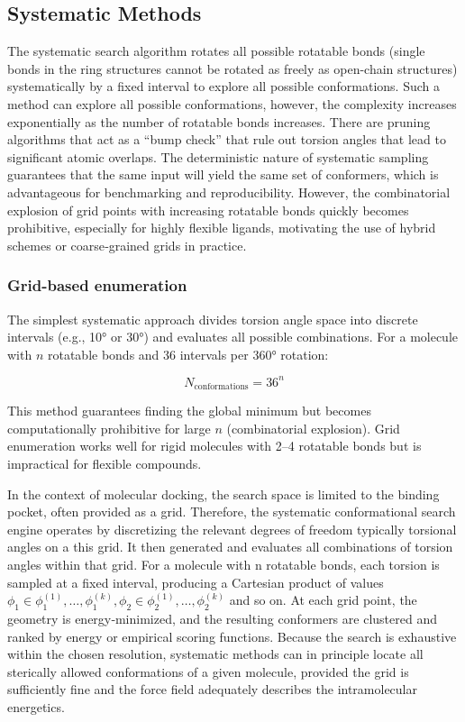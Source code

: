 \documentclass[12pt]{article}
\begin{document}
\subsection{Systematic Methods}
The systematic search algorithm rotates all possible rotatable bonds (single bonds in the ring structures cannot be rotated as freely as open-chain structures) systematically by a fixed interval to explore all possible conformations. Such a method can explore all possible conformations, however, the complexity increases exponentially as the number of rotatable bonds increases. There are pruning algorithms that act as a “bump check” that rule out torsion angles that lead to significant atomic overlaps. The deterministic nature of systematic sampling guarantees that the same input will yield the same set of conformers, which is advantageous for benchmarking and reproducibility. However, the combinatorial explosion of grid points with increasing rotatable bonds quickly becomes prohibitive, especially for highly flexible ligands, motivating the use of hybrid schemes or coarse‑grained grids in practice\cite{CH2_Beusen1996,CH2_Leach2001}.

\subsubsection{Grid-based enumeration} 
 
    The simplest systematic approach divides torsion angle space into discrete intervals (e.g., 10° or 30°) and evaluates all possible combinations. For a molecule with $n$ rotatable bonds and 36 intervals per 360° rotation:

\begin{equation}
N_{\text{conformations}} = 36^n
\label{eq:grid_enumeration}
\end{equation}

    This method guarantees finding the global minimum but becomes computationally prohibitive for large $n$ (combinatorial explosion). Grid enumeration works well for rigid molecules with 2--4 rotatable bonds but is impractical for flexible compounds.
    
    In the context of molecular docking, the search space is limited to the binding pocket, often provided as a grid. Therefore, the systematic conformational search engine operates by discretizing the relevant degrees of freedom typically torsional angles on a this grid.  It then generated and evaluates all combinations of torsion angles within that grid. For a molecule with n rotatable bonds, each torsion  is sampled at a fixed interval, producing a Cartesian product of values  $\phi_1 \in {\phi_1^{(1)}, \dots, \phi_1^{(k)}}, \phi_2 \in {\phi_2^{(1)}, \dots, \phi_2^{(k)}}$ and so on. At each grid point, the geometry is energy‑minimized, and the resulting conformers are clustered and ranked by energy or empirical scoring functions. Because the search is exhaustive within the chosen resolution, systematic methods can in principle locate all sterically allowed conformations of a given molecule, provided the grid is sufficiently fine and the force field adequately describes the intramolecular energetics\cite{CH2_Ferreira2015}.
  
\end{document}

